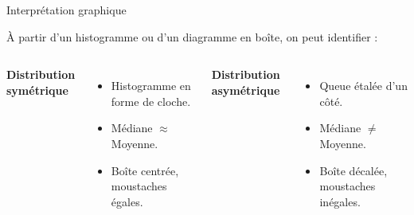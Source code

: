 \documentclass{BeamerTemplate}
\begin{document}
\begin{frame}[t]{Interprétation graphique}

À partir d'un histogramme ou d'un diagramme en boîte, on peut identifier :

\bigskip
\begin{columns}[t]
\textbf{Distribution symétrique}
\begin{itemize}
  \item Histogramme en forme de cloche.
  \item Médiane $\approx$ Moyenne.
  \item Boîte centrée, moustaches égales.
\end{itemize}

\textbf{Distribution asymétrique}
\begin{itemize}
  \item Queue étalée d'un côté.
  \item Médiane $\neq$ Moyenne.
  \item Boîte décalée, moustaches inégales.
\end{itemize}
\end{columns}

\end{frame}
\end{document}
